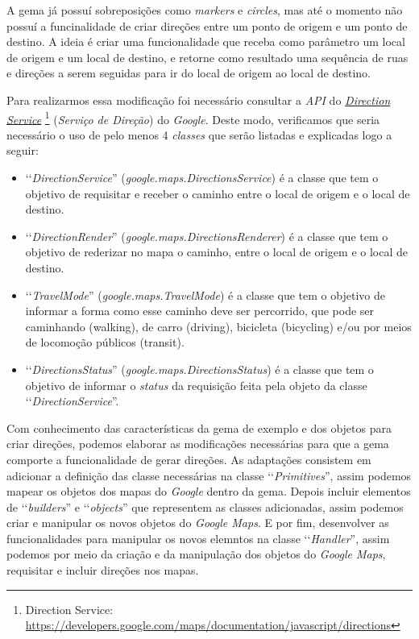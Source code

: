 A gema já possuí sobreposições como \emph{markers} e \emph{circles}, mas até o momento não possuí a 
funcinalidade de criar direções entre um ponto de origem e um ponto de destino. A ideia é criar 
uma funcionalidade que receba como parâmetro um local de origem e um local de destino, e retorne como
resultado uma sequência de ruas e direções a serem seguidas para ir do local de origem ao local de destino.

Para realizarmos essa modificação foi necessário consultar a \emph{API} do 
\emph{\href{https://developers.google.com/maps/documentation/javascript/directions}{Direction Service}} 
\footnote{Direction Service: \url{https://developers.google.com/maps/documentation/javascript/directions}}
(\emph{Serviço de Direção}) do \emph{Google}. Deste modo, verificamos que seria necessário o uso de pelo
menos 4 \emph{classes} que serão listadas e explicadas logo a seguir:

\begin{itemize}

 \item ‘‘\emph{DirectionService}'' (\emph{google.maps.DirectionsService}) é a classe que tem o 
 objetivo de requisitar e receber o caminho entre o local de origem e o local de destino.
 
 \item ‘‘\emph{DirectionRender}'' (\emph{google.maps.DirectionsRenderer}) é a classe que tem o 
 objetivo de rederizar no mapa o caminho, entre o local de origem e o local de destino.
 
 \item ‘‘\emph{TravelMode}'' (\emph{google.maps.TravelMode}) é a classe que tem o objetivo de 
 informar a forma como esse caminho deve ser percorrido, que pode ser caminhando (walking), de carro 
 (driving), bicicleta (bicycling) e/ou por meios de locomoção públicos (transit).
 
 \item ‘‘\emph{DirectionsStatus}'' (\emph{google.maps.DirectionsStatus}) é a classe que tem o
 objetivo de informar o \emph{status} da requisição feita pela objeto da classe
 ‘‘\emph{DirectionService}''.
 
\end{itemize}

Com conhecimento das características da gema de exemplo e dos objetos para criar direções, podemos
elaborar as modificações necessárias para que a gema comporte a funcionalidade de gerar direções.
As adaptações consistem em adicionar a definição das classe necessárias na classe
‘‘\emph{Primitives}'', assim podemos mapear os objetos dos mapas do \emph{Google} dentro da gema. Depois
incluir elementos de ‘‘\emph{builders}'' e ‘‘\emph{objects}'' que representem as classes adicionadas,
assim podemos criar e manipular os novos objetos do \emph{Google Maps}. E por fim, desenvolver as
funcionalidades para manipular os novos elemntos na classe ‘‘\emph{Handler}'', assim podemos por meio
da criação e da manipulação dos objetos do \emph{Google Maps}, requisitar e incluir direções nos mapas.

